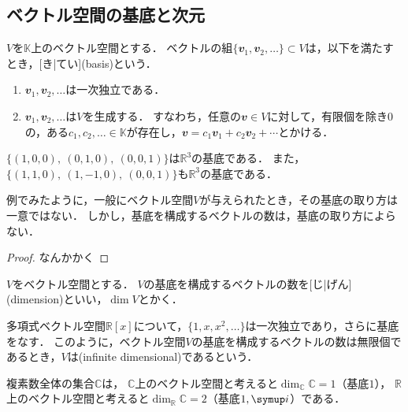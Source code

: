 \documentclass[../sotsu.tex]{subfiles}
\begin{document}
\subsection{ベクトル空間の基底と次元}

\begin{definition}[基底]
    \label{dfn:basis}
    $V$を$𝕂$上のベクトル空間とする．
    ベクトルの組$ \{ 𝒗_1, 𝒗_2, \dotsc \} \subset V$は，以下を満たすとき，[き|てい](basis)という．
    \begin{enumerate}
        \item \label{base:linearly-independent} $𝒗_1, 𝒗_2, \dotsc$は一次独立である．
        \item \label{base:spans-V} $𝒗_1, 𝒗_2, \dotsc$は$V$を生成する．
            すなわち，任意の$𝒗 \in V$に対して，有限個を除き$0$の，ある$c_1, c_2, \dotsc \in 𝕂$が存在し，$𝒗 = c_1 𝒗_1 + c_2 𝒗_2 + \dotsb$とかける．
    \end{enumerate}
\end{definition}

\begin{example}
    $ \{ (1, 0, 0), \ (0, 1, 0), \ (0, 0, 1) \} $は$ℝ^3$の基底である．
    また，$ \{ (1, 1, 0), \ (1, -1, 0), \ (0, 0, 1) \} $も$ℝ^3$の基底である．
\end{example}

例でみたように，一般にベクトル空間$V$が与えられたとき，その基底の取り方は一意ではない．
しかし，基底を構成するベクトルの数は，基底の取り方によらない．
\begin{proof}
    なんかかく
\end{proof}

\begin{definition}[次元]
    \label{dfn:dimension}
    $V$をベクトル空間とする．
    $V$の基底を構成するベクトルの数を[じ|げん](dimension)といい，$\dim V$とかく．
\end{definition}

\begin{example}
    多項式ベクトル空間$ℝ[x]$について，$\{ 1, x, x^2, \dotsc \}$は一次独立であり，さらに基底をなす．
    このように，ベクトル空間$V$の基底を構成するベクトルの数は無限個であるとき，$V$は(infinite dimensional)であるという．
\end{example}

\begin{example}
    複素数全体の集合$ℂ$は，
    $ℂ$上のベクトル空間と考えると$\dim_{ℂ} ℂ = 1$（基底$1$），
    $ℝ$上のベクトル空間と考えると$\dim_{ℝ} ℂ = 2$（基底$1, \iu$）である．
\end{example}
\end{document}

